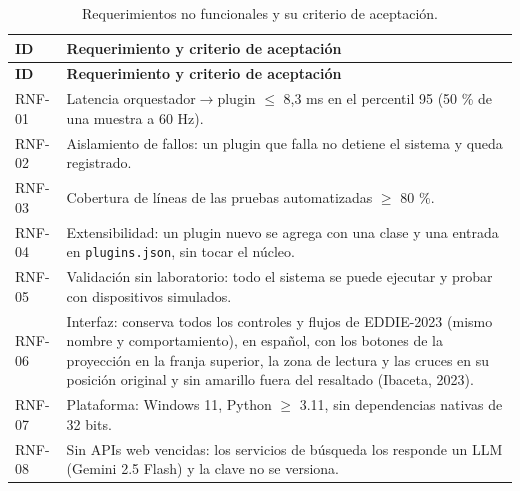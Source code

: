 \begin{longtable}{p{1.8cm} p{12.6cm}}
\caption{Requerimientos no funcionales y su criterio de aceptación.}\label{tab:rnf}\\
\toprule \textbf{ID} & \textbf{Requerimiento y criterio de aceptación} \\ \midrule \endfirsthead
\toprule \textbf{ID} & \textbf{Requerimiento y criterio de aceptación} \\ \midrule \endhead
\bottomrule \endfoot
RNF-01 & Latencia orquestador$\rightarrow$plugin $\leq$ 8,3 ms en el percentil 95 (50 \% de una muestra a 60 Hz). \\
RNF-02 & Aislamiento de fallos: un plugin que falla no detiene el sistema y queda registrado. \\
RNF-03 & Cobertura de líneas de las pruebas automatizadas $\geq$ 80 \%. \\
RNF-04 & Extensibilidad: un plugin nuevo se agrega con una clase y una entrada en \texttt{plugins.json}, sin tocar el núcleo. \\
RNF-05 & Validación sin laboratorio: todo el sistema se puede ejecutar y probar con dispositivos simulados. \\
RNF-06 & Interfaz: conserva todos los controles y flujos de EDDIE-2023 (mismo nombre y comportamiento), en español, con los botones de la proyección en la franja superior, la zona de lectura y las cruces en su posición original y sin amarillo fuera del resaltado (Ibaceta, 2023). \\
RNF-07 & Plataforma: Windows 11, Python $\geq$ 3.11, sin dependencias nativas de 32 bits. \\
RNF-08 & Sin APIs web vencidas: los servicios de búsqueda los responde un LLM (Gemini 2.5 Flash) y la clave no se versiona. \\
\end{longtable}
